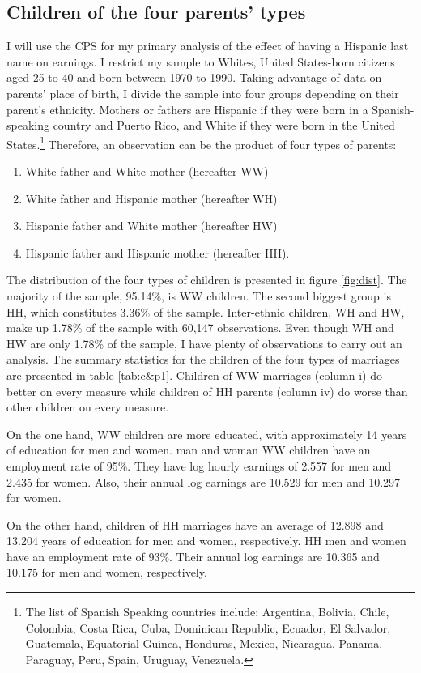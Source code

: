 \documentclass{wptemp}
\begin{document}
\subsection{Children of the four parents' types}
I will use the CPS for my primary analysis of the effect of having a Hispanic last name on earnings. I restrict my sample to Whites, United States-born citizens aged 25 to 40 and born between 1970 to 1990. Taking advantage of data on parents' place of birth, I divide the sample into four groups depending on their parent's ethnicity. Mothers or fathers are Hispanic if they were born in a Spanish-speaking country and Puerto Rico, and White if they were born in the United States.\footnote{The list of Spanish Speaking countries include: Argentina, Bolivia, Chile, Colombia, Costa Rica, Cuba, Dominican Republic, Ecuador, El Salvador, Guatemala, Equatorial Guinea, Honduras, Mexico, Nicaragua, Panama, Paraguay, Peru, Spain, Uruguay, Venezuela.} Therefore, an observation can be the product of four types of parents: 
\begin{enumerate}
\item White father and White mother (hereafter WW) 
\item White father and Hispanic mother (hereafter WH)
\item Hispanic father and White mother (hereafter HW)
\item Hispanic father and Hispanic mother (hereafter HH).
\end{enumerate}
The distribution of the four types of children is presented in figure \ref{fig:dist}. The majority of the sample, 95.14\%, is WW children. The second biggest group is HH, which constitutes 3.36\% of the sample. Inter-ethnic children, WH and HW, make up 1.78\% of the sample with 60,147 observations. Even though WH and HW are only 1.78\% of the sample, I have plenty of observations to carry out an analysis. The summary statistics for the children of the four types of marriages are presented in table \ref{tab:c&p1}. Children of WW marriages (column i) do better on every measure while children of HH parents (column iv) do worse than other children on every measure. 

On the one hand, WW children are more educated, with approximately 14 years of education for men and women. man and woman WW children have an employment rate of 95\%. They have log hourly earnings of 2.557 for men and 2.435 for women. Also, their annual log earnings are 10.529 for men and 10.297 for women.

On the other hand, children of HH marriages have an average of 12.898 and 13.204 years of education for men and women, respectively. HH men and women have an employment rate of 93\%. Their annual log earnings are 10.365 and 10.175 for men and women, respectively. 
\end{document}
